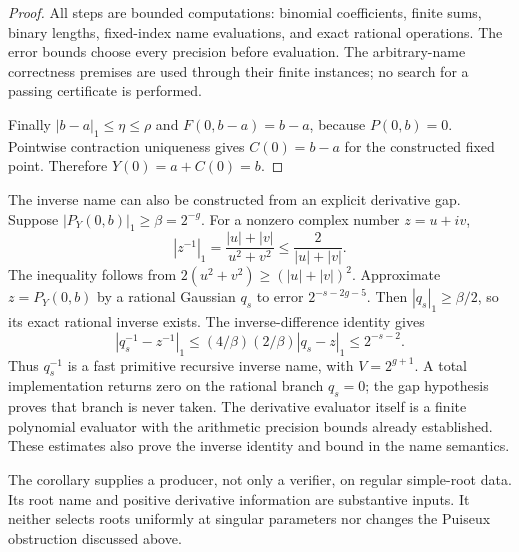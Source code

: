 \begin{proof}
All steps are bounded computations: binomial coefficients, finite sums,
binary lengths, fixed-index name evaluations, and exact rational
operations.  The error bounds choose every precision before evaluation.
The arbitrary-name correctness premises are used through their finite
instances; no search for a passing certificate is performed.

Finally $|b-a|_1\le\eta\le\rho$ and
$F(0,b-a)=b-a$, because $P(0,b)=0$.
Pointwise contraction uniqueness gives $C(0)=b-a$ for the constructed
fixed point.  Therefore $Y(0)=a+C(0)=b$.
\end{proof}

The inverse name can also be constructed from an explicit derivative
gap.  Suppose $|P_Y(0,b)|_1\ge\beta=2^{-g}$.
For a nonzero complex number $z=u+iv$,
\[
 |z^{-1}|_1=\frac{|u|+|v|}{u^2+v^2}
 \le\frac{2}{|u|+|v|}.
\]
The inequality follows from
$2(u^2+v^2)\ge(|u|+|v|)^2$.
Approximate $z=P_Y(0,b)$ by a rational Gaussian $q_s$ to error
$2^{-s-2g-5}$.  Then $|q_s|_1\ge\beta/2$, so its exact rational
inverse exists.  The inverse-difference identity gives
\[
 |q_s^{-1}-z^{-1}|_1
 \le (4/\beta)(2/\beta)|q_s-z|_1
 \le2^{-s-2}.
\]
Thus $q_s^{-1}$ is a fast primitive recursive inverse name, with
$V=2^{g+1}$.  A total implementation returns zero on the rational
branch $q_s=0$; the gap hypothesis proves that branch is never taken.
The derivative evaluator itself is a finite polynomial evaluator with
the arithmetic precision bounds already established.  These estimates
also prove the inverse identity and bound in the name semantics.

The corollary supplies a producer, not only a verifier, on regular
simple-root data.  Its root name and positive derivative information are
substantive inputs.  It neither selects roots uniformly at singular
parameters nor changes the Puiseux obstruction discussed above.
